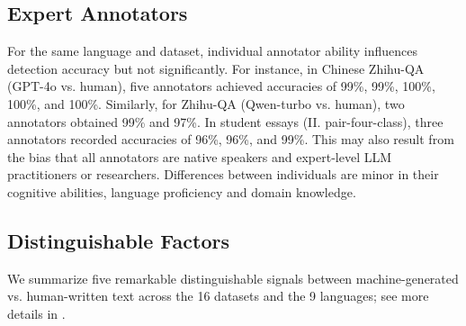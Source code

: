 \subsection{Expert Annotators}
For the same language and dataset, individual annotator ability influences detection accuracy but not significantly. 
For instance, in Chinese Zhihu-QA (GPT-4o vs. human), five annotators achieved accuracies of 99\%, 99\%, 100\%, 100\%, and 100\%. Similarly, for Zhihu-QA (Qwen-turbo vs. human), two annotators obtained 99\% and 97\%. In student essays (II. pair-four-class), three annotators recorded accuracies of 96\%, 96\%, and 99\%.
This may also result from the bias that all annotators are native speakers and expert-level LLM practitioners or researchers. Differences between individuals are minor in their cognitive abilities, language proficiency and domain knowledge.



\subsection{Distinguishable Factors}
\label{sec:dis-factor}
We summarize five remarkable distinguishable signals between machine-generated vs. human-written text across the 16 datasets and the 9 languages; see more details in . %

